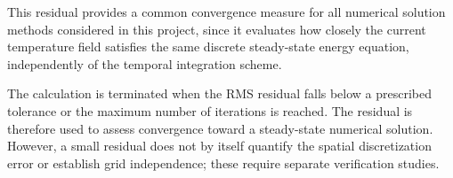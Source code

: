 This residual provides a common convergence measure for all
numerical solution methods considered in this project, since
it evaluates how closely the current temperature field
satisfies the same discrete steady-state energy equation,
independently of the temporal integration scheme.

The calculation is terminated when the RMS residual falls
below a prescribed tolerance or the maximum number of
iterations is reached. The residual is therefore used to
assess convergence toward a steady-state numerical solution.
However, a small residual does not by itself quantify the
spatial discretization error or establish grid independence;
these require separate verification studies.